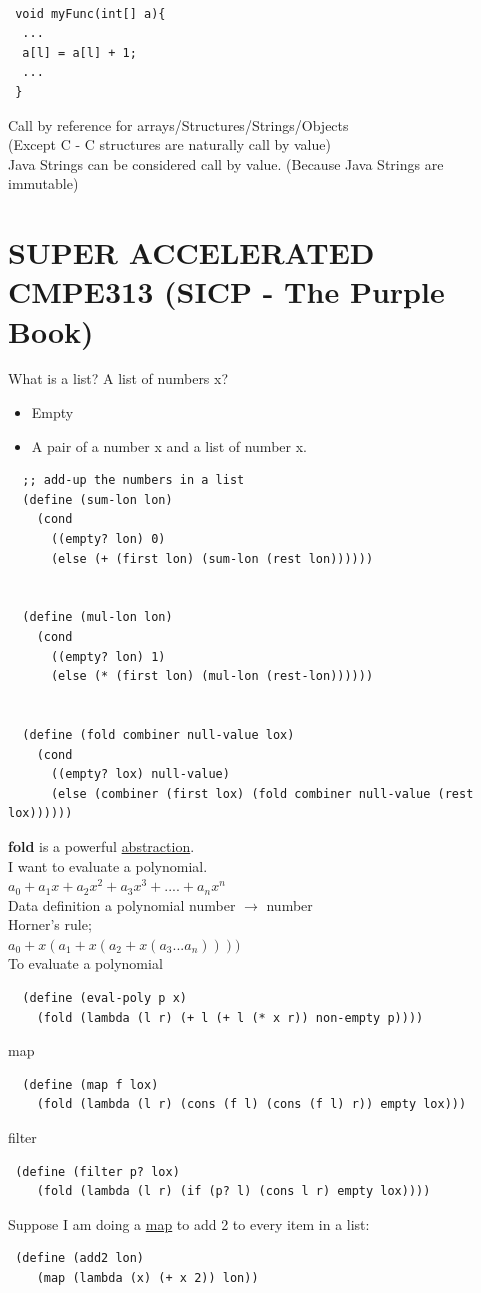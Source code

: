 \documentclass{article}
\begin{document}
\begin{flushleft}
\begin{verbatim}
 
 void myFunc(int[] a){
  ...
  a[l] = a[l] + 1;
  ...
 }
\end{verbatim}
\begin{flushleft}
Call by reference for arrays/Structures/Strings/Objects\\
(Except C - C structures are naturally call by value)\\
Java Strings can be considered call by value. (Because Java Strings are immutable)
\end{flushleft}

\section*{SUPER ACCELERATED CMPE313 (SICP - The Purple Book)}
\begin{flushleft}
 What is a list? A list of numbers x?
 \begin{itemize}
  \item Empty
  \item A pair of a number x and a list of number x.
 \end{itemize}
 \begin{verbatim}
  ;; add-up the numbers in a list
  (define (sum-lon lon)
    (cond
      ((empty? lon) 0)
      (else (+ (first lon) (sum-lon (rest lon))))))
      

  (define (mul-lon lon)
    (cond
      ((empty? lon) 1)
      (else (* (first lon) (mul-lon (rest-lon))))))
      
      
  (define (fold combiner null-value lox)
    (cond
      ((empty? lox) null-value)
      (else (combiner (first lox) (fold combiner null-value (rest lox))))))
 \end{verbatim}
 \textbf{fold} is a powerful \underline{abstraction}.\\
 \bigskip
 I want to evaluate a polynomial.\\
 $ {a}_{0} + {a}_{1}x + {a}_{2}{x}^{2} + {a}_{3}{x}^{3} +....+ {a}_{n}{x}^{n} $ \\
 Data definition a polynomial number $\rightarrow$ number\\
 \bigskip
 Horner's rule;\\
 ${a}_{0} + x({a}_{1} + x({a}_{2} + x({a}_{3}...{a}_{n}))))$\\
 \bigskip
 To evaluate a polynomial\\
 \begin{verbatim}
  (define (eval-poly p x)
    (fold (lambda (l r) (+ l (+ l (* x r)) non-empty p))))
 \end{verbatim}
 map
 \begin{verbatim}
  (define (map f lox) 
    (fold (lambda (l r) (cons (f l) (cons (f l) r)) empty lox)))
 \end{verbatim}
\bigskip
 filter
\begin{verbatim}
 (define (filter p? lox)
    (fold (lambda (l r) (if (p? l) (cons l r) empty lox))))
\end{verbatim}
Suppose I am doing a \underline{map} to add 2 to every item in a list:
\begin{verbatim}
 (define (add2 lon)
    (map (lambda (x) (+ x 2)) lon))
    

\end{verbatim}
\end{flushleft}
\end{flushleft}
\end{document}
